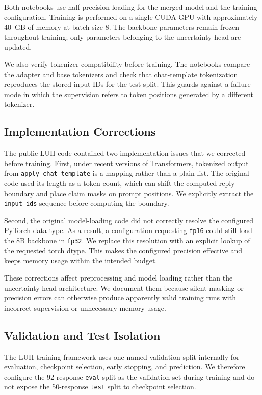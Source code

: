 \documentclass[conference]{IEEEtran}
\begin{document}
Both notebooks use half-precision loading for the merged model and the training configuration. Training is performed on a single CUDA GPU with approximately 40~GB of memory at batch size 8. The backbone parameters remain frozen throughout training; only parameters belonging to the uncertainty head are updated.

We also verify tokenizer compatibility before training. The notebooks compare the adapter and base tokenizers and check that chat-template tokenization reproduces the stored input IDs for the test split. This guards against a failure mode in which the supervision refers to token positions generated by a different tokenizer.

\subsection{Implementation Corrections}

The public LUH code contained two implementation issues that we corrected before training. First, under recent versions of Transformers, tokenized output from \texttt{apply\_chat\_template} is a mapping rather than a plain list. The original code used its length as a token count, which can shift the computed reply boundary and place claim masks on prompt positions. We explicitly extract the \texttt{input\_ids} sequence before computing the boundary.

Second, the original model-loading code did not correctly resolve the configured PyTorch data type. As a result, a configuration requesting \texttt{fp16} could still load the 8B backbone in \texttt{fp32}. We replace this resolution with an explicit lookup of the requested torch dtype. This makes the configured precision effective and keeps memory usage within the intended budget.

These corrections affect preprocessing and model loading rather than the uncertainty-head architecture. We document them because silent masking or precision errors can otherwise produce apparently valid training runs with incorrect supervision or unnecessary memory usage.

\subsection{Validation and Test Isolation}

The LUH training framework uses one named validation split internally for evaluation, checkpoint selection, early stopping, and prediction. We therefore configure the 92-response \texttt{eval} split as the validation set during training and do not expose the 50-response \texttt{test} split to checkpoint selection.
\end{document}
